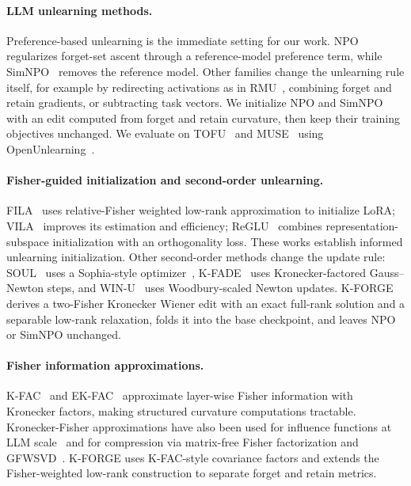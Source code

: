 \documentclass[11pt]{article}
\begin{document}
\paragraph{LLM unlearning methods.}
Preference-based unlearning is the immediate setting for our work. NPO~\citep{npo} regularizes forget-set ascent through a reference-model preference term, while SimNPO~\citep{simnpo} removes the reference model. Other families change the unlearning rule itself, for example by redirecting activations as in RMU~\citep{rmu}, combining forget and retain gradients, or subtracting task vectors. We initialize NPO and SimNPO with an edit computed from forget and retain curvature, then keep their training objectives unchanged. We evaluate on TOFU~\citep{tofu} and MUSE~\citep{muse} using OpenUnlearning~\citep{openunlearning}.



\paragraph{Fisher-guided initialization and second-order unlearning.}
FILA~\citep{fila} uses relative-Fisher weighted low-rank approximation to initialize LoRA; VILA~\citep{vila} improves its estimation and efficiency; ReGLU~\citep{xiao-etal-2026-representation} combines representation-subspace initialization with an orthogonality loss. These works establish informed unlearning initialization. Other second-order methods change the update rule: SOUL~\citep{soul} uses a Sophia-style optimizer~\citep{sophia}, K-FADE~\citep{kfade} uses Kronecker-factored Gauss--Newton steps, and WIN-U~\citep{winu} uses Woodbury-scaled Newton updates. K-FORGE derives a two-Fisher Kronecker Wiener edit with an exact full-rank solution and a separable low-rank relaxation, folds it into the base checkpoint, and leaves NPO or SimNPO unchanged.



\paragraph{Fisher information approximations.}
K-FAC~\citep{martens2015optimizing} and EK-FAC~\citep{exfac} approximate layer-wise Fisher information with Kronecker factors, making structured curvature computations tractable. Kronecker-Fisher approximations have also been used for
influence functions at LLM scale~\citep{DBLP:journals/corr/abs-2308-03296} and for compression via matrix-free Fisher factorization and GFWSVD~\citep{chekalina_2026_gfwsvd}. K-FORGE uses K-FAC-style covariance factors and extends the Fisher-weighted low-rank construction to separate forget and retain metrics.
\end{document}
